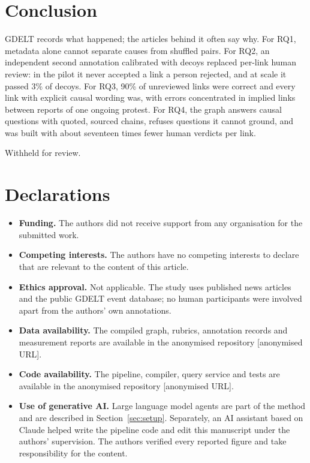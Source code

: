 \documentclass[pdflatex,sn-basic,lineno]{sn-jnl}
\theoremstyle{thmstylethree}
\theoremstyle{thmstyleone}
\begin{document}
\section{Conclusion}\label{sec:conclusion}

GDELT records what happened; the articles behind it often say why. For RQ1, metadata alone
cannot separate causes from shuffled pairs. For RQ2, an independent second annotation calibrated
with decoys replaced per-link human review: in the pilot it never accepted a link a person
rejected, and at scale it passed 3\% of decoys. For RQ3, 90\% of unreviewed links were correct and
every link with explicit causal wording was, with errors concentrated in implied links between
reports of one ongoing protest. For RQ4, the graph answers causal questions with quoted, sourced
chains, refuses questions it cannot ground, and was built with about seventeen times fewer human
verdicts per link.

\backmatter

Withheld for review.

\section*{Declarations}

\begin{itemize}
\item \textbf{Funding.} The authors did not receive support from any organisation for the submitted work.
\item \textbf{Competing interests.} The authors have no competing interests to declare that are relevant to the content of this article.
\item \textbf{Ethics approval.} Not applicable. The study uses published news articles and the
public GDELT event database; no human participants were involved apart from the authors' own
annotations.
\item \textbf{Data availability.} The compiled graph, rubrics, annotation records and measurement
reports are available in the anonymised repository [anonymised URL].
\item \textbf{Code availability.} The pipeline, compiler, query service and tests are available in
the anonymised repository [anonymised URL].
\item \textbf{Use of generative AI.} Large language model agents are part of the method and are
described in Section~\ref{sec:setup}. Separately, an AI assistant based on Claude helped write the
pipeline code and edit this manuscript under the authors' supervision. The authors verified every
reported figure and take responsibility for the content.
\end{itemize}


\end{document}

